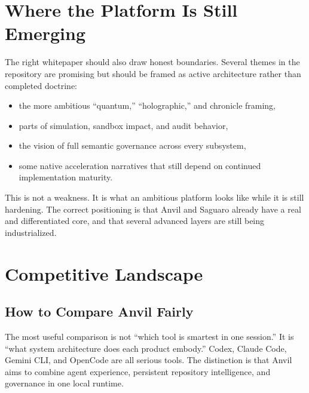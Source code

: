 \documentclass[11pt,a4paper]{article}
\begin{document}
\section{Where the Platform Is Still Emerging}
The right whitepaper should also draw honest boundaries. Several themes in the repository are promising but should be framed as active architecture rather than completed doctrine:
\begin{itemize}
    \item the more ambitious ``quantum,'' ``holographic,'' and chronicle framing,
    \item parts of simulation, sandbox impact, and audit behavior,
    \item the vision of full semantic governance across every subsystem,
    \item some native acceleration narratives that still depend on continued implementation maturity.
\end{itemize}

This is not a weakness. It is what an ambitious platform looks like while it is still hardening. The correct positioning is that Anvil and Saguaro already have a real and differentiated core, and that several advanced layers are still being industrialized.

\section{Competitive Landscape}
\subsection{How to Compare Anvil Fairly}
The most useful comparison is not ``which tool is smartest in one session.'' It is ``what system architecture does each product embody.'' Codex, Claude Code, Gemini CLI, and OpenCode are all serious tools. The distinction is that Anvil aims to combine agent experience, persistent repository intelligence, and governance in one local runtime.
\end{document}
